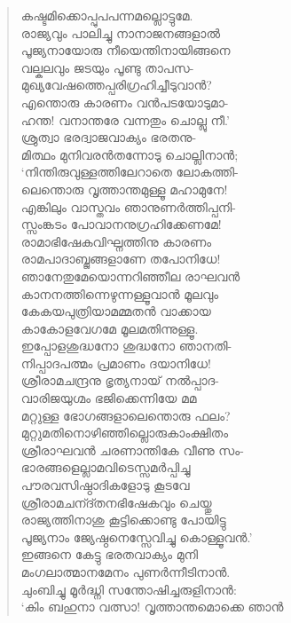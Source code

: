 \begin{verse}
കഷ്ടമിക്കൊപ്പുപപന്നമല്ലൊട്ടുമേ.\\
രാജ്യവും പാലിച്ചു നാനാജനങ്ങളാല്‍\\
പൂജ്യനായോരു നീയെന്തിനായിങ്ങനെ\\
വല്കലവും ജടയും പൂണ്ടു താപസ-\\
മുഖ്യവേഷത്തെപ്പരിഗ്രഹിച്ചീടുവാന്‍?\\
എന്തൊരു കാരണം വന്‍പടയോടുമാ-\\
ഹന്ത! വനാന്തരേ വന്നതും ചൊല്ലു നീ.’\\
ശ്രുത്വാ ഭരദ്വാജവാക്യം ഭരതനു-\\
മിത്ഥം മുനിവരന്‍തന്നോടു ചൊല്ലിനാന്‍;\\
‘നിന്തിരുവുള്ളത്തിലേറാതെ ലോകത്തി-\\
ലെന്തൊരു വൃത്താന്തമുള്ളൂ മഹാമുനേ!\\
എങ്കിലും വാസ്തവം ഞാനുണര്‍ത്തിപ്പനി-\\
സ്സംങ്കടം പോവാനനുഗ്രഹിക്കേണമേ!\\
രാമാഭിഷേകവിഘ്നത്തിനു കാരണം\\
രാമപാദാബ്ജങ്ങളാണേ തപോനിധേ!\\
ഞാനേതുമേയൊന്നറിഞ്ഞീല രാഘവന്‍\\
കാനനത്തിന്നെഴുന്നള്ളൂവാന്‍ മൂലവും\\
കേകയപുത്രിയാമമ്മതന്‍ വാക്കായ\\
കാകോളവേഗമേ മൂലമതിന്നുള്ളൂ.\\
ഇപ്പോളശുദ്ധനോ ശുദ്ധനോ ഞാനതി-\\
നിപ്പാദപത്മം പ്രമാണം ദയാനിധേ!\\
ശ്രീരാമചന്ദ്രനു ഭൃത്യനായ് നല്‍പ്പാദ-\\
വാരിജയുഗ്മം ഭജിക്കെന്നിയേ മമ\\
മറ്റുള്ള ഭോഗങ്ങളാലെന്തൊരു ഫലം?\\
മുറ്റുമതിനൊഴിഞ്ഞില്ലൊരുകാംക്ഷിതം\\
ശ്രീരാഘവന്‍ ചരണാന്തികേ വീണു സം-\\
ഭാരങ്ങളെല്ലാമവിടെസ്സമര്‍പ്പിച്ചു\\
പൗരവസിഷ്ഠാദികളോടു കൂടവേ\\
ശ്രീരാമചന്ദ്തനഭിഷേകവും ചെയ്തു\\
രാജ്യത്തിനാശു കൂട്ടിക്കൊണ്ടു പോയിട്ടു\\
പൂജ്യനാം ജ്യേഷ്ഠനെസ്സേവിച്ചു കൊള്ളൂവന്‍.’\\
ഇങ്ങനെ കേട്ടു ഭരതവാക്യം മുനി\\
മംഗലാത്മാനമേനം പുണര്‍ന്നീടിനാന്‍.\\
ചുംബിച്ചു മൂര്‍ദ്ധ്നി സന്തോഷിച്ചരുളിനാന്‍:\\
‘കിം ബഹുനാ വത്സാ! വൃത്താന്തമൊക്കെ ഞാന്‍\\

\end{verse}
